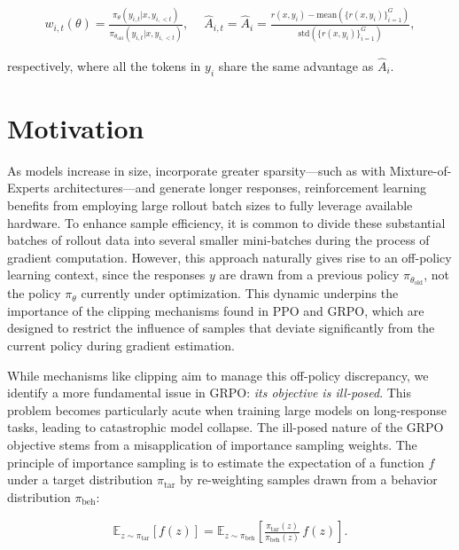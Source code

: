 \begin{align}
    w_{i,t}(\theta)=\frac{ \pi_{\theta} (y_{i,t} | x, y_{i,<t}) }{ \pi_{\theta_\text{old}} (y_{i,t} | x,y_{i,<t})},\quad\ 
    \widehat{A}_{i,t} = \widehat{A}_{i} = \frac{r(x, y_i) - \mathrm{mean} \left( \{ r(x, y_i) \}_{i=1}^G \right) }{ \mathrm{std} \left( \{ r(x, y_i) \}_{i=1}^G \right) },
\end{align}

respectively, where all the tokens in $y_i$ share the same advantage as $\widehat{A}_{i}$.

\section{Motivation}
\label{sec:motivation}

As models increase in size, incorporate greater sparsity—such as with Mixture-of-Experts architectures—and generate longer responses, reinforcement learning benefits from employing large rollout batch sizes to fully leverage available hardware. To enhance sample efficiency, it is common to divide these substantial batches of rollout data into several smaller mini-batches during the process of gradient computation. However, this approach naturally gives rise to an off-policy learning context, since the responses $y$ are drawn from a previous policy $\pi_{\theta_\text{old}}$, not the policy $\pi_\theta$ currently under optimization. This dynamic underpins the importance of the clipping mechanisms found in PPO and GRPO, which are designed to restrict the influence of samples that deviate significantly from the current policy during gradient estimation.

While mechanisms like clipping aim to manage this off-policy discrepancy, we identify a more fundamental issue in GRPO: \textit{its objective is ill-posed}. This problem becomes particularly acute when training large models on long-response tasks, leading to catastrophic model collapse. The ill-posed nature of the GRPO objective stems from a misapplication of importance sampling weights. The principle of importance sampling is to estimate the expectation of a function $f$ under a target distribution $\pi_\text{tar}$ by re-weighting samples drawn from a behavior distribution $\pi_\text{beh}$:

\begin{align}
\mathbb{E}_{z \sim \pi_\text{tar}} \left[ f(z) \right] = \mathbb{E}_{z \sim \pi_\text{beh}} \left[ \frac{ \pi_\text{tar} (z) }{ \pi_\text{beh} (z)} \, f(z) \right].
\end{align}

